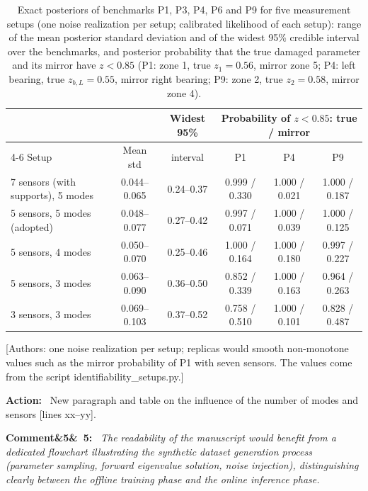 \documentclass[11pt]{article}
\newenvironment{rcomment}[1]{\par\bigskip\noindent\textbf{Comment\ifx&#1&\else\ #1\fi:}\ \itshape}{\par}
\newenvironment{action}{\par\smallskip\noindent\color{resp}\textbf{Action:}\ }{\par}
\newcommand{\authornote}[1]{\textcolor{note}{\textsf{[Authors: #1]}}}
\newcommand{\tbd}[1]{\textcolor{note}{\textsf{[#1]}}}
\newcommand{\lines}[1]{\tbd{lines #1}}
\begin{document}
\begin{table}[H]
\centering\small
\caption{Exact posteriors of benchmarks P1, P3, P4, P6 and P9 for five measurement setups (one noise realization per
setup; calibrated likelihood of each setup): range of the mean posterior standard deviation and of the widest 95\%
credible interval over the benchmarks, and posterior probability that the true damaged parameter and its mirror have
$z<0.85$ (P1: zone 1, true $z_1=0.56$, mirror zone 5; P4: left bearing, true $z_{b,L}=0.55$, mirror right bearing; P9:
zone 2, true $z_2=0.58$, mirror zone 4).}
\label{tab:modes}
\footnotesize\setlength{\tabcolsep}{4pt}
\begin{tabular}{lccccc}
\toprule
 & & Widest 95\% & \multicolumn{3}{c}{Probability of $z<0.85$: true / mirror} \\
\cmidrule(l){4-6}
Setup & Mean std & interval & P1 & P4 & P9 \\
\midrule
7 sensors (with supports), 5 modes & 0.044--0.065 & 0.24--0.37 & 0.999 / 0.330 & 1.000 / 0.021 & 1.000 / 0.187 \\
5 sensors, 5 modes (adopted) & 0.048--0.077 & 0.27--0.42 & 0.997 / 0.071 & 1.000 / 0.039 & 1.000 / 0.125 \\
5 sensors, 4 modes & 0.050--0.070 & 0.25--0.46 & 1.000 / 0.164 & 1.000 / 0.180 & 0.997 / 0.227 \\
5 sensors, 3 modes & 0.063--0.090 & 0.36--0.50 & 0.852 / 0.339 & 1.000 / 0.163 & 0.964 / 0.263 \\
3 sensors, 3 modes & 0.069--0.103 & 0.37--0.52 & 0.758 / 0.510 & 1.000 / 0.101 & 0.828 / 0.487 \\
\bottomrule
\end{tabular}
\end{table}
\authornote{one noise realization per setup; replicas would smooth non-monotone values such as the mirror probability of
P1 with seven sensors. The values come from the script identifiability\_setups.py.}

\begin{action}
New paragraph and table on the influence of the number of modes and sensors \lines{xx--yy}.
\end{action}

\begin{rcomment}{5}
The readability of the manuscript would benefit from a dedicated flowchart illustrating the synthetic dataset
generation process (parameter sampling, forward eigenvalue solution, noise injection), distinguishing clearly between
the offline training phase and the online inference phase.
\end{rcomment}
\end{document}
